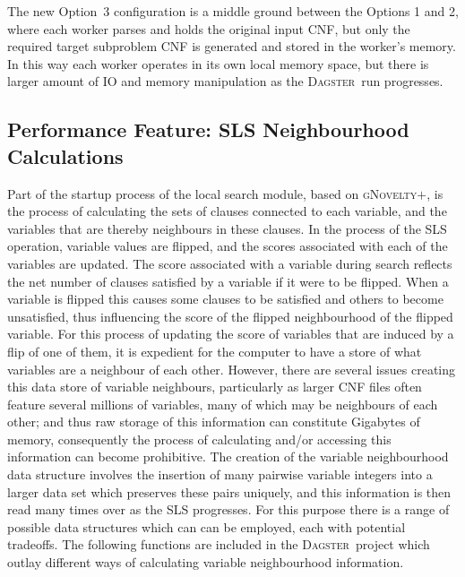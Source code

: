 \documentclass[10pt,a4paper,oneside,headinclude,footinclude,BCOR5mm]{scrartcl}
\newcommand{\dagster}{\textsc{Dagster}\xspace}
\newcommand{\gnoveltyp}{\textsc{gNovelty$+$}\xspace}
\begin{document}
The new Option~3 configuration is a middle ground between the Options 1 and 2, where each worker parses and holds the original input CNF, but only the required target subproblem CNF is generated and stored in the worker's memory. In this way each worker operates in its own local memory space, but there is larger amount of IO and memory manipulation as the \dagster\ run progresses.



\subsection{Performance Feature: SLS Neighbourhood Calculations}\label{sec:neighbourhood_calculation}

Part of the startup process of the local search module, based on \gnoveltyp, is the process of calculating the sets of clauses connected to each variable, and the variables that are thereby neighbours in these clauses.
In the process of the SLS operation, variable values are flipped, and the scores associated with each of the variables are updated.
The score associated with a variable during search reflects the net number of clauses satisfied by a variable if it were to be flipped.
When a variable is flipped this causes some clauses to be satisfied and others to become unsatisfied, thus influencing the score of the flipped neighbourhood of the flipped variable.
For this process of updating the score of variables that are induced by a flip of one of them, it is expedient for the computer to have a store of what variables are a neighbour of each other.
However, there are several issues creating this data store of variable neighbours, particularly as larger CNF files often feature several millions of variables, many of which may be neighbours of each other; and thus raw storage of this information can constitute Gigabytes of memory, consequently the process of calculating and/or accessing this information can become prohibitive.
The creation of the variable neighbourhood data structure involves the insertion of many pairwise variable integers into a larger data set which preserves these pairs uniquely, and this information is then read many times over as the SLS progresses.
For this purpose there is a range of possible data structures which can can be employed, each with potential tradeoffs.
The following functions are included in the \dagster\ project which outlay different ways of calculating variable neighbourhood information.
\end{document}
